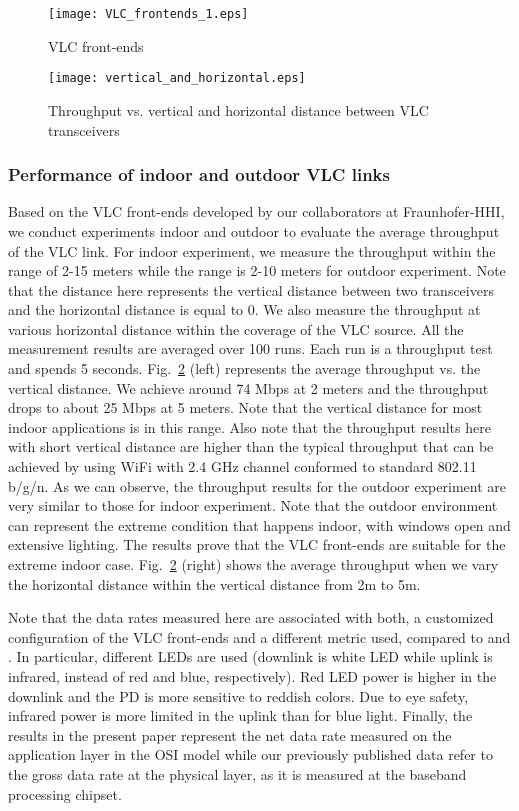 \documentclass[10pt,journal]{IEEEtran}
\begin{document}
\begin{figure}
\centering
\texttt{[image: VLC\_frontends\_1.eps]}
\caption{VLC front-ends}
\label{fig_VLC_frontends}
\end{figure}

\begin{figure}
\centering
\texttt{[image: vertical\_and\_horizontal.eps]}
\caption{Throughput vs. vertical and horizontal distance between VLC transceivers}
\label{fig_vertical_horizontal}
\end{figure}

\subsubsection{Performance of indoor and outdoor VLC links}
Based on the VLC front-ends developed by our collaborators at Fraunhofer-HHI, we conduct experiments indoor and outdoor to evaluate the average throughput of the VLC link. For indoor experiment, we measure the throughput within the range of 2-15 meters while the range is 2-10 meters for outdoor experiment. Note that the distance here represents the vertical distance between two transceivers and the horizontal distance is equal to 0. We also measure the throughput at various horizontal distance within the coverage of the VLC source. All the measurement results are averaged over 100 runs. Each run is a throughput test and spends 5 seconds. Fig.~\ref{fig_vertical_horizontal} (left) represents the average throughput vs. the vertical distance. We achieve around 74 Mbps at 2 meters and the throughput drops to about 25 Mbps at 5 meters. Note that the vertical distance for most indoor applications is in this range. Also note that the throughput results here with short vertical distance are higher than the typical throughput that can be achieved by using WiFi with 2.4 GHz channel conformed to standard 802.11 b/g/n. As we can observe, the throughput results for the outdoor experiment are very similar to those for indoor experiment. Note that the outdoor environment can represent the extreme condition that happens indoor, with windows open and extensive lighting. The results prove that the VLC front-ends are suitable for the extreme indoor case. Fig.~\ref{fig_vertical_horizontal} (right) shows the average throughput when we vary the horizontal distance within the vertical distance from 2m to 5m.

Note that the data rates measured here are associated with both, a customized configuration of the VLC front-ends and a different metric used, compared to \cite{langeroptoelectronics} and \cite{grobe2013high}. In particular, different LEDs are used (downlink is white LED while uplink is infrared, instead of red and blue, respectively). Red LED power is higher in the downlink and the PD is more sensitive to reddish colors. Due to eye safety, infrared power is more limited in the uplink than for blue light. Finally, the results in the present paper represent the net data rate measured on the application layer in the OSI model while our previously published data refer to the gross data rate at the physical layer, as it is measured at the baseband processing chipset.
\end{document}
